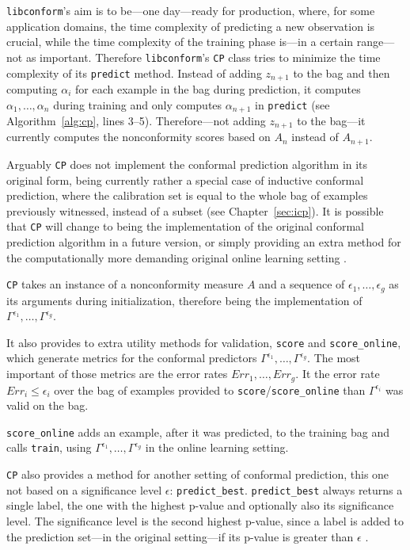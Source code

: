 \documentclass[twoside,11pt]{article}
\def\libconform{\texttt{libconform}}
\begin{document}
\libconform{}'s aim is to be---one day---ready for
production, where, for some application domains, the time
complexity of predicting a new observation is crucial,
while the time complexity of the training phase
is---in a certain range---not as important.
Therefore \libconform{}'s \texttt{CP} class tries to
minimize the time complexity of its \texttt{predict}
method. Instead of adding $z_{n+1}$ to the bag and then
computing $\alpha_i$ for each example in the bag during
prediction, it computes $\alpha_1,\dots,\alpha_n$ during
training and only computes $\alpha_{n+1}$ in
\texttt{predict} (see Algorithm~\ref{alg:cp}, lines 3--5).
Therefore---not adding $z_{n+1}$ to the bag---it
currently computes the nonconformity scores based on
$A_n$ instead of $A_{n+1}$.

Arguably \texttt{CP} does not implement the conformal
prediction algorithm in its original form, being currently
rather a special case of inductive conformal prediction,
where the calibration set is equal to the whole bag of
examples previously witnessed, instead of a subset (see
Chapter~\ref{sec:icp}).
It is possible that \texttt{CP} will change to being the
implementation of the original conformal prediction
algorithm in a future version, or simply providing an extra
method for the computationally more demanding original
online learning setting \citet[see][Chapter 2]{alrw}.

\texttt{CP} takes an instance of a nonconformity measure
$A$ and a sequence of $\epsilon_1,\dots,\epsilon_{g}$
as its arguments during initialization, therefore being the
implementation of
$\Gamma^{\epsilon_1},\dots,\Gamma^{\epsilon_g}$.

It also provides to extra utility methods for validation,
\texttt{score} and \texttt{score\_online}, which generate
metrics for the conformal predictors
$\Gamma^{\epsilon_1},\dots,\Gamma^{\epsilon_g}$.
The most important of those metrics are the error rates
$Err_1,\dots,Err_{g}$.
It the error rate $Err_i \leq \epsilon_i$ over the bag of
examples provided to \texttt{score}/\texttt{score\_online}
than $\Gamma^{\epsilon_i}$ was valid on the bag.

\texttt{score\_online} adds an example, after it was
predicted, to the training bag and calls \texttt{train},
using $\Gamma^{\epsilon_1},\dots,\Gamma^{\epsilon_g}$ in
the online learning setting.

\texttt{CP} also provides a method for another setting of
conformal prediction, this one not based on a significance
level $\epsilon$: \texttt{predict\_best}.
\texttt{predict\_best} always returns a single label, the
one with the highest p-value and optionally also its
significance level. The significance level is the second
highest p-value, since a label is added to the prediction
set---in the original setting---if its p-value is greater
than $\epsilon$ \citep[see][]{papadopoulos_et_al_2007}.
\end{document}
